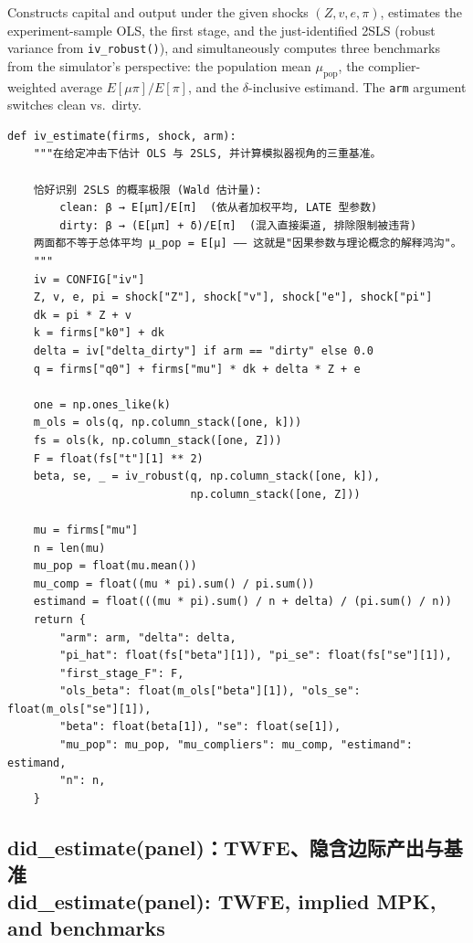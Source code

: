 \documentclass[12pt,a4paper]{ctexart}
\begin{document}
Constructs capital and output under the given shocks $(Z,v,e,\pi)$, estimates the experiment-sample OLS, the first stage, and the just-identified 2SLS (robust variance from \texttt{iv\_robust()}), and simultaneously computes three benchmarks from the simulator's perspective: the population mean $\mu_{\mathrm{pop}}$, the complier-weighted average $E[\mu\pi]/E[\pi]$, and the $\delta$-inclusive estimand. The \texttt{arm} argument switches clean vs.\ dirty.

\begin{lstlisting}[style=pycode]
def iv_estimate(firms, shock, arm):
    """在给定冲击下估计 OLS 与 2SLS, 并计算模拟器视角的三重基准。

    恰好识别 2SLS 的概率极限 (Wald 估计量):
        clean: β → E[μπ]/E[π]  (依从者加权平均, LATE 型参数)
        dirty: β → (E[μπ] + δ)/E[π]  (混入直接渠道, 排除限制被违背)
    两面都不等于总体平均 μ_pop = E[μ] —— 这就是"因果参数与理论概念的解释鸿沟"。
    """
    iv = CONFIG["iv"]
    Z, v, e, pi = shock["Z"], shock["v"], shock["e"], shock["pi"]
    dk = pi * Z + v
    k = firms["k0"] + dk
    delta = iv["delta_dirty"] if arm == "dirty" else 0.0
    q = firms["q0"] + firms["mu"] * dk + delta * Z + e

    one = np.ones_like(k)
    m_ols = ols(q, np.column_stack([one, k]))
    fs = ols(k, np.column_stack([one, Z]))
    F = float(fs["t"][1] ** 2)
    beta, se, _ = iv_robust(q, np.column_stack([one, k]),
                            np.column_stack([one, Z]))

    mu = firms["mu"]
    n = len(mu)
    mu_pop = float(mu.mean())
    mu_comp = float((mu * pi).sum() / pi.sum())
    estimand = float(((mu * pi).sum() / n + delta) / (pi.sum() / n))
    return {
        "arm": arm, "delta": delta,
        "pi_hat": float(fs["beta"][1]), "pi_se": float(fs["se"][1]),
        "first_stage_F": F,
        "ols_beta": float(m_ols["beta"][1]), "ols_se": float(m_ols["se"][1]),
        "beta": float(beta[1]), "se": float(se[1]),
        "mu_pop": mu_pop, "mu_compliers": mu_comp, "estimand": estimand,
        "n": n,
    }
\end{lstlisting}

\subsection[did\_estimate]{did\_estimate(panel)：TWFE、隐含边际产出与基准\\[1pt]\normalsize did\_estimate(panel): TWFE, implied MPK, and benchmarks}
\end{document}
